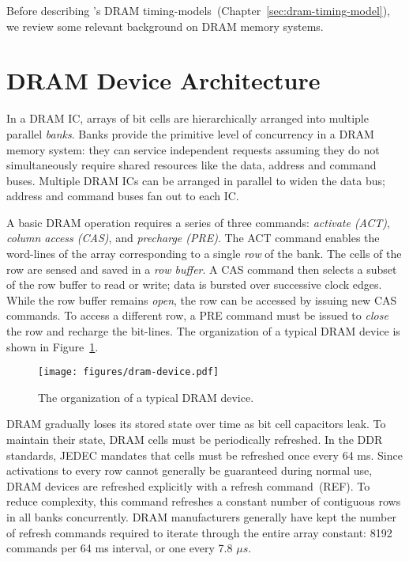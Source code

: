Before describing \PNAME's DRAM timing-models~(Chapter~\ref{sec:dram-timing-model}), we review some relevant background
on DRAM memory systems.

\section{DRAM Device Architecture}\label{sec:dram-arch}
In a DRAM IC, arrays of bit cells are hierarchically arranged into multiple
parallel \textit{banks}. Banks provide the primitive level of concurrency in a
DRAM memory system: they can service independent requests assuming they do not
simultaneously require shared resources like the data, address and command
buses.  Multiple DRAM ICs can be arranged in parallel to widen the data bus;
address and command buses fan out to each IC.

A basic DRAM operation requires a series of three commands: \textit{activate (ACT)},
\textit{column access (CAS)}, and \textit{precharge (PRE)}. The ACT command
enables the word-lines of the array corresponding to a single \textit{row} of
the bank. The cells of the row are sensed and saved in a \textit{row
buffer}. A CAS command then selects a subset of the row buffer to
read or write; data is bursted over successive clock edges. While the row
buffer remains \textit{open}, the row can be accessed by issuing new CAS
commands. To access a different row, a PRE command must be
issued to \textit{close} the row and recharge the bit-lines.
The organization of a typical DRAM device is shown in Figure~\ref{fig:dram-device}.

\begin{figure}
	\centering
	\texttt{[image: figures/dram-device.pdf]}
    \caption{The organization of a typical DRAM device.}
	\label{fig:dram-device}
\end{figure}

DRAM gradually loses its stored state over time as bit cell capacitors leak. To
maintain their state, DRAM cells must be periodically refreshed. In the DDR
standards, JEDEC mandates that cells must be refreshed once every 64
ms. Since activations to every row cannot generally be guaranteed during normal
use, DRAM devices are refreshed explicitly with a refresh command~(REF). To
reduce complexity, this command refreshes a constant number of contiguous rows
in all banks concurrently. DRAM manufacturers generally have kept the number of
refresh commands required to iterate through the entire array constant: 8192
commands per 64 ms interval, or one every 7.8 $\mu s$.
